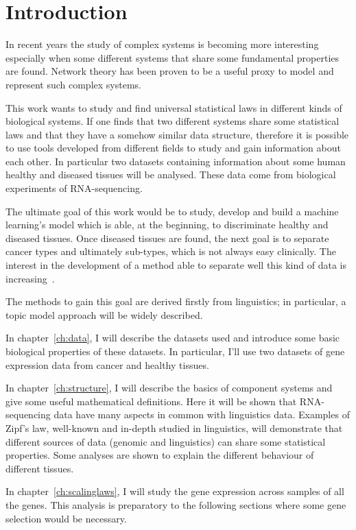 \chapter*{Introduction}\label{ch:intro}
In recent years the study of complex systems is becoming more interesting especially when some different systems that share  some fundamental properties are found. Network theory has been proven to be a useful proxy to model and represent such complex systems.

This work wants to study and find universal statistical laws in different kinds of biological systems. If one finds that two different systems share some statistical laws and that they have a somehow similar data structure, therefore it is possible to use tools developed from different fields to study and gain information about each other. In particular two datasets containing information about some human healthy and diseased tissues will be analysed. These data come from biological experiments of RNA-sequencing.

The ultimate goal of this work would be to study, develop and build a machine learning's model which is able, at the beginning, to discriminate healthy and diseased tissues. Once diseased tissues are found, the next goal is to separate cancer types and ultimately sub-types, which is not always easy clinically. The interest in the development of a method able to separate well this kind of data is increasing~\cite{Farver2018}.

The methods to gain this goal are derived firstly from linguistics; in particular, a topic model approach will be widely described.

In chapter~\ref{ch:data}, I will describe the datasets used and introduce some basic biological properties of these datasets. In particular, I'll use two datasets of gene expression data from cancer and healthy tissues.

In chapter~\ref{ch:structure}, I will describe the basics of component systems and give some useful mathematical definitions. Here it will be shown that RNA-sequencing data have many aspects in common with linguistics data. Examples of Zipf's law, well-known and in-depth studied in linguistics, will demonstrate that different sources of data (genomic and linguistics) can share some statistical properties. Some analyses are shown to explain the different behaviour of different tissues.

In chapter~\ref{ch:scalinglaws}, I will study the gene expression across samples of all the genes. This analysis is preparatory to the following sections where some gene selection would be necessary.

